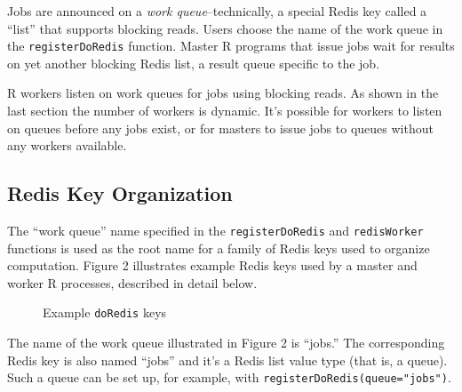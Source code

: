 \documentclass[12pt]{article}
\begin{document}
Jobs are announced on a \emph{work queue}--technically, a special Redis key
called a ``list'' that supports blocking reads. Users choose the name of the
work queue in the \verb+registerDoRedis+ function. Master R programs that issue
jobs wait for results on yet another blocking Redis list, a result queue
specific to the job.

R workers listen on work queues for jobs using blocking reads.  As shown in the
last section the number of workers is dynamic.  It's possible for workers to
listen on queues before any jobs exist, or for masters to issue jobs to queues
without any workers available.


\subsection{Redis Key Organization}

The ``work queue'' name specified in the {\tt registerDoRedis} and
{\tt redisWorker} functions is used as the root name for a family of Redis
keys used to organize computation. Figure 2 illustrates example Redis
keys used by a master and worker R processes, described in detail below.

\begin{figure}[!ht]
\begin{center}
\end{center}
\caption{Example {\tt doRedis} keys}
\label{keys}
\end{figure}

The name of the work queue illustrated in Figure 2 is ``jobs.'' The
corresponding Redis key is also named ``jobs'' and it's a Redis list value type
(that is, a queue).  Such a queue can be set up, for example, with
\verb+registerDoRedis(queue="jobs")+.
\end{document}
